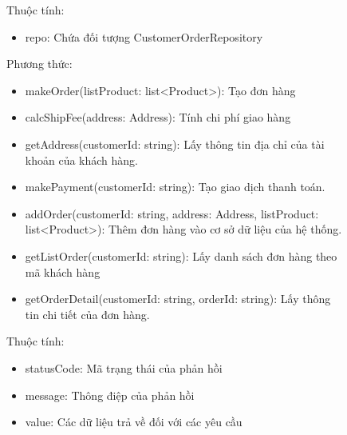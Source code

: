 \begin{figure}[!htp]
	Thuộc tính:
	\begin{itemize}
		\item repo: Chứa đối tượng CustomerOrderRepository
	\end{itemize}
	Phương thức:
	\begin{itemize}
		\item makeOrder(listProduct: list<Product>): Tạo đơn hàng
		\item calcShipFee(address: Address): Tính chi phí giao hàng
		\item getAddress(customerId: string): Lấy thông tin địa chỉ của tài khoản của khách hàng.
		\item makePayment(customerId: string): Tạo giao dịch thanh toán.
		\item addOrder(customerId: string, address: Address, listProduct: list<Product>): Thêm đơn hàng vào cơ sở dữ liệu của hệ thống.
		\item getListOrder(customerId: string): Lấy danh sách đơn hàng theo mã khách hàng
		\item getOrderDetail(customerId: string, orderId: string): Lấy thông tin chi tiết của đơn hàng.
	\end{itemize}

	Thuộc tính:
	\begin{itemize}
		\item statusCode: Mã trạng thái của phản hồi
		\item message: Thông điệp của phản hồi
		\item value: Các dữ liệu trả về đối với các yêu cầu
	\end{itemize}
	


\end{figure}
